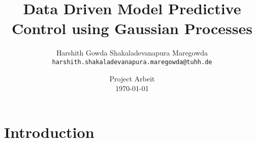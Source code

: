 





 \def\isenglish{true} 		%

\title{Data Driven Model Predictive Control using Gaussian Processes}

\author[Harshith S.]{Harshith Gowda Shakaladevanapura Maregowda \texorpdfstring{\\}{} {\small\texttt{harshith.shakaladevanapura.maregowda@tuhh.de}}}


\date[\today]{Project Arbeit \\ \today}

\subject{Control Systems}



\begin{frame}
	\titlepage
\end{frame}

\part{Introduction}





